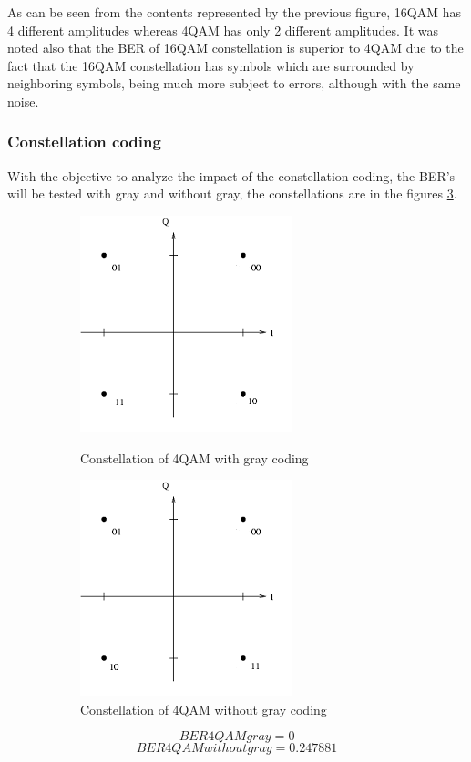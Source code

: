 As can be seen from the contents represented by the previous figure, 16QAM has 4 different amplitudes whereas 4QAM has only 2 different amplitudes.  It was noted also that the BER of 16QAM constellation is superior to 4QAM due to the fact that the 16QAM constellation has symbols which are surrounded by neighboring symbols, being much more subject to errors, although with the same noise.
\newpage
\subsubsection*{Constellation coding}
With the objective to analyze the impact of the constellation coding, the BER's will be tested with gray and without gray, the constellations are in the figures \ref{Constellation coding}.
\begin{figure}[H]
	\centering
        \begin{subfigure}{.55\textwidth}
        \centering
        	\includegraphics[scale=1]{./lib/m_qam_transmitter/figure_PLoureiro/4QAM_gray.png}
        \label{Example_4QAM_gray}\caption{Constellation of 4QAM with gray coding}
        \end{subfigure}%
        \begin{subfigure}{.55\textwidth}
        \centering
        	\includegraphics[scale=1]{./lib/m_qam_transmitter/figure_PLoureiro/4QAM_cons.png}
        	\caption{Constellation of 4QAM without gray coding}\label{Example_4QAM_nogray}
        \end{subfigure}
        \caption{}\label{Constellation coding}
\end{figure}
\begin{equation*}
BER 4QAM gray = 0
\end{equation*}
\begin{equation*}
BER 4QAM without gray = 0.247881
\end{equation*}

